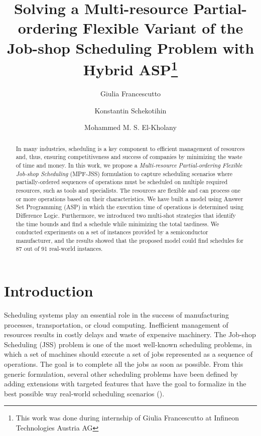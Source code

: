\documentclass[submission,copyright,creativecommons]{eptcs}
\title{Solving a Multi-resource Partial-ordering Flexible Variant of the Job-shop Scheduling Problem with Hybrid ASP\thanks{This work was done during internship of Giulia Francescutto at Infineon Technologies Austria AG}}
\author{Giulia Francescutto
\institute{Siemens AG {\"O}sterreich\\ Vienna, Austria}
\email{giulia.francescutto@siemens.com}
\and
Konstantin Schekotihin
\institute{Alpen-Adria-Univeristy\\
Klagenfurt, Austria}
\email{konstantin.schekotihin@aau.at}
\and
Mohammed M. S. El-Kholany
\institute{Alpen-Adria-Univeristy, Klagenfurt, Austria}
\institute{Cairo University, Cairo, Egypt}
\email{mohammed.el-kholany@aau.at}
}
\newcommand{\jss}{MPF-JSS\xspace}
\begin{document}
\maketitle

\begin{abstract}
  In many industries, scheduling is a key component to efficient management of resources and, thus, ensuring competitiveness and success of companies by minimizing the waste of time and money. In this work, we propose a \emph{Multi-resource Partial-ordering Flexible Job-shop Scheduling} (\jss) formulation to capture scheduling scenarios where partially-ordered sequences of operations must be scheduled on multiple required resources, such as tools and specialists.
  The resources are flexible and can process one or more operations based on their characteristics. We have built a model using Answer Set Programming (ASP) in which the execution time of operations is determined using Difference Logic. Furthermore, we introduced two multi-shot strategies that identify the time bounds and find a schedule while minimizing the total tardiness. We conducted experiments on a set of instances provided by a semiconductor manufacturer, and the results showed that the proposed model could find schedules for 87 out of 91 real-world instances.
\end{abstract}

\section{Introduction}
Scheduling systems play an essential role in the success of manufacturing processes, transportation, or cloud computing. Inefficient management of resources results in costly delays and waste of expensive machinery. The Job-shop Scheduling (JSS) problem is one of the most well-known scheduling problems, in which a set of machines should execute a set of jobs represented as a sequence of operations. The goal is to complete all the jobs as soon as possible. From this generic formulation, several other scheduling problems have been defined by adding extensions with targeted features that have the goal to formalize in the best possible way real-world scheduling scenarios (\cite{brucker1990job}). %
\end{document}
